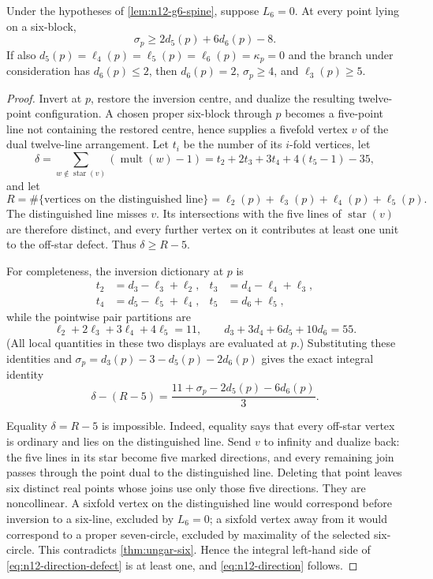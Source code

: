 \begin{lemma}\label{lem:n12-direction}
Under the hypotheses of \cref{lem:n12-g6-spine}, suppose $L_6=0$.  At every
point lying on a six-block,
\begin{equation}\label{eq:n12-direction}
 \sigma_p\ge2d_5(p)+6d_6(p)-8.
\end{equation}
If also $d_5(p)=\ell_4(p)=\ell_5(p)=\ell_6(p)=\kappa_p=0$ and the branch
under consideration has $d_6(p)\le2$, then $d_6(p)=2$, $\sigma_p\ge4$,
and $\ell_3(p)\ge5$.
\end{lemma}

\begin{proof}
Invert at $p$, restore the inversion centre, and dualize the resulting
twelve-point configuration.  A chosen proper six-block through $p$ becomes
a five-point line not containing the restored centre, hence supplies a
fivefold vertex $v$ of the dual twelve-line arrangement.  Let $t_i$ be the
number of its $i$-fold vertices, let
\[
 \delta=\sum_{w\notin\operatorname{star}(v)}
              (\operatorname{mult}(w)-1)
        =t_2+2t_3+3t_4+4(t_5-1)-35,
\]
and let
\[
 R=\#\{\text{vertices on the distinguished line}\}
   =\ell_2(p)+\ell_3(p)+\ell_4(p)+\ell_5(p).
\]
The distinguished line misses $v$.  Its intersections with the five lines
of $\operatorname{star}(v)$ are therefore distinct, and every further
vertex on it contributes at least one unit to the off-star defect.  Thus
$\delta\ge R-5$.

For completeness, the inversion dictionary at $p$ is
\[
 \begin{aligned}
 t_2&=d_3-\ell_3+\ell_2,&
 t_3&=d_4-\ell_4+\ell_3,\\
 t_4&=d_5-\ell_5+\ell_4,&
 t_5&=d_6+\ell_5,
 \end{aligned}
\]
while the pointwise pair partitions are
\[
 \ell_2+2\ell_3+3\ell_4+4\ell_5=11,
 \qquad
 d_3+3d_4+6d_5+10d_6=55.
\]
(All local quantities in these two displays are evaluated at $p$.)
Substituting these identities and
$\sigma_p=d_3(p)-3-d_5(p)-2d_6(p)$ gives the exact integral identity
\begin{equation}\label{eq:n12-direction-defect}
 \delta-(R-5)
 =\frac{11+\sigma_p-2d_5(p)-6d_6(p)}3.
\end{equation}

Equality $\delta=R-5$ is impossible.  Indeed, equality says that every
off-star vertex is ordinary and lies on the distinguished line.  Send $v$
to infinity and dualize back: the five lines in its star become five marked
directions, and every remaining join passes through the point dual to the
distinguished line.  Deleting that point leaves six distinct real points
whose joins use only those five directions.  They are noncollinear.  A
sixfold vertex on the distinguished line would correspond before inversion
to a six-line, excluded by $L_6=0$; a sixfold vertex away from it would
correspond to a proper seven-circle, excluded by maximality of the selected
six-circle.  This contradicts \cref{thm:ungar-six}.  Hence the integral
left-hand side of \eqref{eq:n12-direction-defect} is at least one, and
\eqref{eq:n12-direction} follows.


\end{proof}
